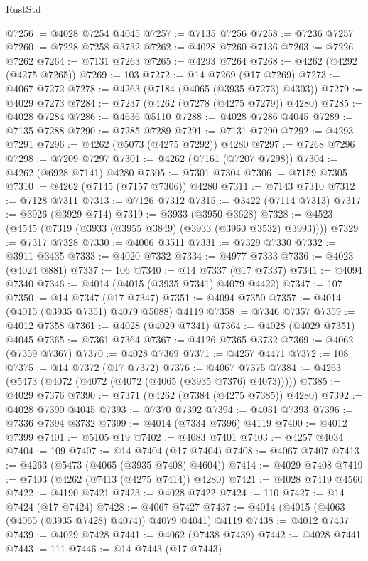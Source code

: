 \begin{lexlean}{RustStd}
\begin{coremodule}
@7256 := @4028 @7254 @4045
@7257 := @7135 @7256
@7258 := @7236 @7257
@7260 := @7228 @7258 @3732
@7262 := @4028 @7260 @7136
@7263 := @7226 @7262
@7264 := @7131 @7263
@7265 := @4293 @7264
@7268 := @4262 (@4292 (@4275 @7265))
@7269 := 103
@7272 := @14 @7269 (@17 @7269)
@7273 := @4067 @7272
@7278 := @4263 (@7184 (@4065 (@3935 @7273) @4303))
@7279 := @4029 @7273
@7284 := @7237 (@4262 (@7278 (@4275 @7279)) @4280)
@7285 := @4028 @7284
@7286 := @4636 @5110
@7288 := @4028 @7286 @4045
@7289 := @7135 @7288
@7290 := @7285 @7289
@7291 := @7131 @7290
@7292 := @4293 @7291
@7296 := @4262 (@5073 (@4275 @7292)) @4280
@7297 := @7268 @7296
@7298 := @7209 @7297
@7301 := @4262 (@7161 (@7207 @7298))
@7304 := @4262 (@6928 @7141) @4280
@7305 := @7301 @7304
@7306 := @7159 @7305
@7310 := @4262 (@7145 (@7157 @7306)) @4280
@7311 := @7143 @7310
@7312 := @7128 @7311
@7313 := @7126 @7312
@7315 := @3422 (@7114 @7313)
@7317 := @3926 (@3929 @714)
@7319 := @3933 (@3950 @3628)
@7328 := @4523 (@4545 (@7319 (@3933 (@3955 @3849) (@3933 (@3960 @3532) @3993))))
@7329 := @7317 @7328
@7330 := @4006 @3511
@7331 := @7329 @7330
@7332 := @3911 @3435
@7333 := @4020 @7332
@7334 := @4977 @7333
@7336 := @4023 (@4024 @881)
@7337 := 106
@7340 := @14 @7337 (@17 @7337)
@7341 := @4094 @7340
@7346 := @4014 (@4015 (@3935 @7341) @4079 @4422)
@7347 := 107
@7350 := @14 @7347 (@17 @7347)
@7351 := @4094 @7350
@7357 := @4014 (@4015 (@3935 @7351) @4079 @5088) @4119
@7358 := @7346 @7357
@7359 := @4012 @7358
@7361 := @4028 (@4029 @7341)
@7364 := @4028 (@4029 @7351) @4045
@7365 := @7361 @7364
@7367 := @4126 @7365 @3732
@7369 := @4062 (@7359 @7367)
@7370 := @4028 @7369
@7371 := @4257 @4471
@7372 := 108
@7375 := @14 @7372 (@17 @7372)
@7376 := @4067 @7375
@7384 := @4263 (@5473 (@4072 (@4072 (@4072 (@4065 (@3935 @7376) @4073)))))
@7385 := @4029 @7376
@7390 := @7371 (@4262 (@7384 (@4275 @7385)) @4280)
@7392 := @4028 @7390 @4045
@7393 := @7370 @7392
@7394 := @4031 @7393
@7396 := @7336 @7394 @3732
@7399 := @4014 (@7334 @7396) @4119
@7400 := @4012 @7399
@7401 := @5105 @19
@7402 := @4083 @7401
@7403 := @4257 @4034
@7404 := 109
@7407 := @14 @7404 (@17 @7404)
@7408 := @4067 @7407
@7413 := @4263 (@5473 (@4065 (@3935 @7408) @4604))
@7414 := @4029 @7408
@7419 := @7403 (@4262 (@7413 (@4275 @7414)) @4280)
@7421 := @4028 @7419 @4560
@7422 := @4190 @7421
@7423 := @4028 @7422
@7424 := 110
@7427 := @14 @7424 (@17 @7424)
@7428 := @4067 @7427
@7437 := @4014 (@4015 (@4063 (@4065 (@3935 @7428) @4074)) @4079 @4041) @4119
@7438 := @4012 @7437
@7439 := @4029 @7428
@7441 := @4062 (@7438 @7439)
@7442 := @4028 @7441
@7443 := 111
@7446 := @14 @7443 (@17 @7443)

\end{coremodule}
\end{lexlean}
